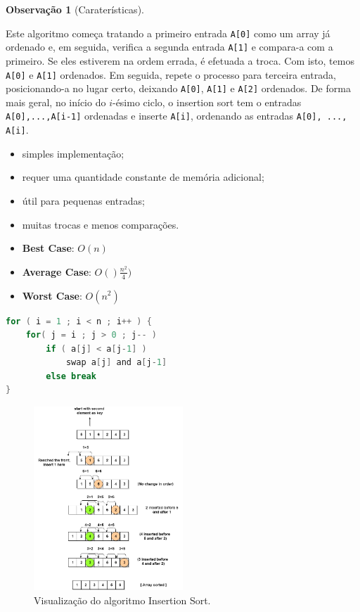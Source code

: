 \documentclass[a4paper, 12pt]{article}
\newtheorem{remark}{Observação}
\begin{document}
\begin{remark}[Caraterísticas]\end{remark}
    Este algoritmo começa tratando  a primeiro entrada \texttt{A[0]} como um array já ordenado e, em seguida, verifica a segunda entrada \texttt{A[1]} e compara-a com
a primeiro. Se eles estiverem na ordem errada, é efetuada a troca. Com isto, temos \texttt{A[0]} e \texttt{A[1]} ordenados.
Em seguida, repete o processo para terceira entrada, posicionando-a no lugar certo, deixando \texttt{A[0]}, \texttt{A[1]} e \texttt{A[2]} ordenados. De forma mais geral, no início do $i$-ésimo ciclo, o insertion sort tem o
entradas \texttt{A[0],...,\texttt{A[i-1]}} ordenadas e inserte \texttt{A[i]}, ordenando as entradas \texttt{A[0], ..., \texttt{A[i]}}.
    \begin{itemize}
        \item simples implementação;
        \item requer uma quantidade constante de memória adicional;
        \item útil para pequenas entradas;
        \item muitas trocas e menos comparações.
        \item \textbf{Best Case}: $O(n)$
        \item \textbf{Average Case}: $O()\frac{n^2}{4})$
        \item \textbf{Worst Case}: $O(n^2)$
    \end{itemize}


\begin{center}
    \begin{lstlisting}[frame=single, language=c, caption=Algoritmo Insertion Sort, captionpos=b]
for ( i = 1 ; i < n ; i++ ) {
    for( j = i ; j > 0 ; j-- )
        if ( a[j] < a[j-1] )
            swap a[j] and a[j-1]
        else break
}            
    \end{lstlisting}

    \begin{figure}[H]
        \centering
        \includegraphics[width=0.5\textwidth]{fig/ao/is.png}
        \caption{Visualização do algoritmo Insertion Sort.}
    \end{figure}
\end{center}
\end{document}
